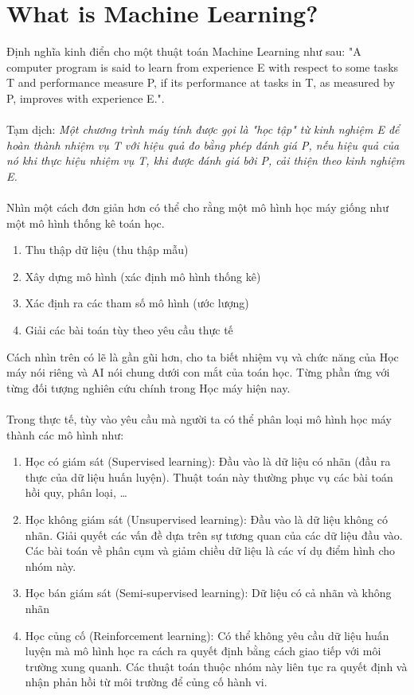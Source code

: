 \documentclass{article}
\begin{document}
\section{What is Machine Learning?}
Định nghĩa kinh điển cho một thuật toán Machine Learning như sau: "A
computer program is said to learn from experience E with respect to some tasks
T and performance measure P, if its performance at tasks in T, as measured by
P, improves with experience E.".
\\\\
Tạm dịch: \textit{Một chương trình máy tính được gọi là "học tập" từ kinh nghiệm E để hoàn thành nhiệm vụ T với hiệu quả đo bằng phép đánh giá P, nếu hiệu quả của nó khi thực hiệu nhiệm vụ T, khi được đánh giá bởi P, cải thiện theo kinh nghiệm E.}
\\\\
Nhìn một cách đơn giản hơn có thể cho rằng một mô hình học máy giống như một mô hình thống kê toán học. 
\begin{enumerate}
    \item Thu thập dữ liệu (thu thập mẫu)
    \item Xây dựng mô hình (xác định mô hình thống kê)
    \item Xác định ra các tham số mô hình (ước lượng)
    \item Giải các bài toán tùy theo yêu cầu thực tế
\end{enumerate}
Cách nhìn trên có lẽ là gần gũi hơn, cho ta biết nhiệm vụ và chức năng của Học máy nói riêng và AI nói chung dưới con mắt của toán học. Từng phần ứng với từng đối tượng nghiên cứu chính trong Học máy hiện nay.\\\\
Trong thực tế, tùy vào yêu cầu mà người ta có thể phân loại mô hình học máy thành các mô hình như:
\begin{enumerate}
    \item Học có giám sát (Supervised learning): Đầu vào là dữ liệu có nhãn (đầu ra thực của dữ liệu huấn luyện). Thuật toán này thường phục vụ các bài toán hồi quy, phân loại, \ldots
    \item Học không giám sát (Unsupervised learning): Đầu vào là dữ liệu không có nhãn. Giải quyết các vấn đề dựa trên sự tương quan của các dữ liệu đầu vào. Các bài toán về phân cụm và giảm chiều dữ liệu là các ví dụ điểm hình cho nhóm này.
    \item Học bán giám sát (Semi-supervised learning): Dữ liệu có cả nhãn và không nhãn
    \item Học củng cố (Reinforcement learning): Có thể không yêu cầu dữ liệu huấn luyện mà mô hình học ra cách ra quyết định bằng cách giao tiếp với môi trường xung quanh. Các thuật toán thuộc nhóm này liên tục ra quyết định và nhận phản hồi từ môi trường để củng cố hành vi.
\end{enumerate}
\end{document}
